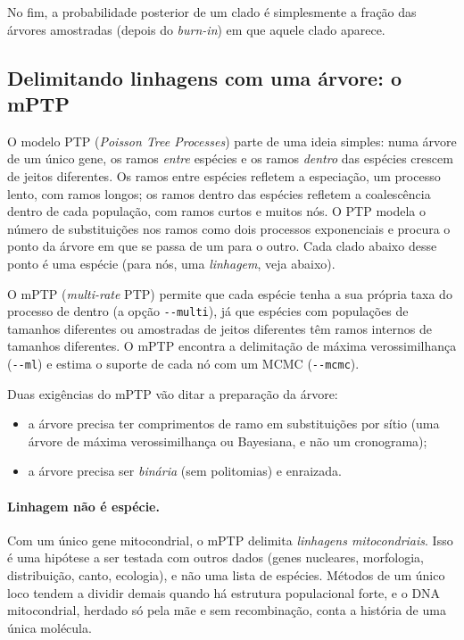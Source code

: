 \documentclass[11pt,a4paper]{article}
\newcommand{\cmd}[1]{\texttt{#1}}
\begin{document}
No fim, a probabilidade posterior de um clado é simplesmente a fração das árvores amostradas
(depois do \emph{burn-in}) em que aquele clado aparece.

\subsection{Delimitando linhagens com uma árvore: o mPTP}

O modelo PTP (\emph{Poisson Tree Processes}) \cite{zhang2013} parte de uma ideia simples: numa
árvore de um único gene, os ramos \emph{entre} espécies e os ramos \emph{dentro} das espécies
crescem de jeitos diferentes. Os ramos entre espécies refletem a especiação, um processo lento,
com ramos longos; os ramos dentro das espécies refletem a coalescência dentro de cada população,
com ramos curtos e muitos nós. O PTP modela o número de substituições nos ramos como dois
processos exponenciais e procura o ponto da árvore em que se passa de um para o outro. Cada clado
abaixo desse ponto é uma espécie (para nós, uma \emph{linhagem}, veja abaixo).

O mPTP (\emph{multi-rate} PTP) \cite{kapli2017} permite que cada espécie tenha a sua própria
taxa do processo de dentro (a opção \cmd{-{}-multi}), já que espécies com populações de tamanhos
diferentes ou amostradas de jeitos diferentes têm ramos internos de tamanhos diferentes. O mPTP
encontra a delimitação de máxima verossimilhança (\cmd{-{}-ml}) e estima o suporte de cada nó com
um MCMC (\cmd{-{}-mcmc}).

Duas exigências do mPTP vão ditar a preparação da árvore:
\begin{itemize}
\item a árvore precisa ter comprimentos de ramo em substituições por sítio (uma árvore de
máxima verossimilhança ou Bayesiana, e não um cronograma);
\item a árvore precisa ser \emph{binária} (sem politomias) e enraizada.
\end{itemize}

\paragraph{Linhagem não é espécie.} Com um único gene mitocondrial, o mPTP delimita
\emph{linhagens mitocondriais}. Isso é uma hipótese a ser testada com outros dados (genes
nucleares, morfologia, distribuição, canto, ecologia), e não uma lista de espécies. Métodos de
um único loco tendem a dividir demais quando há estrutura populacional forte, e o DNA
mitocondrial, herdado só pela mãe e sem recombinação, conta a história de uma única molécula.
\end{document}
